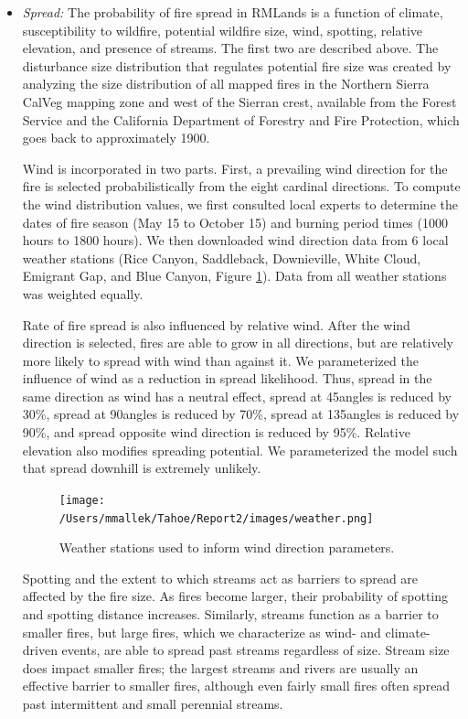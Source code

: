 \begin{itemize}

\item \emph{Spread:} The probability of fire spread in RMLands is a function of climate, susceptibility to wildfire, potential wildfire size, wind, spotting, relative elevation, and presence of streams. The first two are described above. The disturbance size distribution that regulates potential fire size was created by analyzing the size distribution of all mapped fires in the Northern Sierra CalVeg mapping zone and west of the Sierran crest, available from the Forest Service and the California Department of Forestry and Fire Protection, which goes back to approximately 1900. 

Wind is incorporated in two parts. First, a prevailing wind direction for the fire is selected probabilistically from the eight cardinal directions. To compute the wind distribution values, we first consulted local experts to determine the dates of fire season (May 15 to October 15) and burning period times (1000 hours to 1800 hours). We then downloaded wind direction data from 6 local weather stations (Rice Canyon, Saddleback, Downieville, White Cloud, Emigrant Gap, and Blue Canyon, Figure \ref{weather}). Data from all weather stations was weighted equally.

Rate of fire spread is also influenced by relative wind. After the wind direction is selected, fires are able to grow in all directions, but are relatively more likely to spread with wind than against it. We parameterized the influence of wind as a reduction in spread likelihood. Thus, spread in the same direction as wind has a neutral effect, spread at 45\textdegree  angles is reduced by 30\%, spread at 90\textdegree  angles is reduced by 70\%, spread at 135\textdegree  angles is reduced by 90\%, and spread opposite wind direction is reduced by 95\%. Relative elevation also modifies spreading potential. We parameterized the model such that spread downhill is extremely unlikely.

\begin{figure}[htbp]
\centering
\texttt{[image: /Users/mmallek/Tahoe/Report2/images/weather.png]}
\caption{Weather stations used to inform wind direction parameters.}
\label{weather}
\end{figure}

Spotting and the extent to which streams act as barriers to spread are affected by the fire size. As fires become larger, their probability of spotting and spotting distance increases. Similarly, streams function as a barrier to smaller fires, but large fires, which we characterize as wind- and climate-driven events, are able to spread past streams regardless of size. Stream size does impact smaller fires; the largest streams and rivers are usually an effective barrier to smaller fires, although even fairly small fires often spread past intermittent and small perennial streams. 


\end{itemize}
